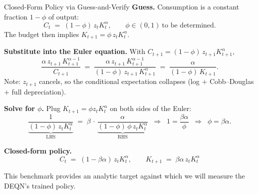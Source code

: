 \documentclass[aspectratio=169,11pt]{beamer}
\newcommand{\emphc}[1]{\textcolor{harvardcrimson}{#1}}
\begin{document}
\begin{frame}{Closed-Form Policy via Guess-and-Verify}
\footnotesize
\textbf{Guess.} Consumption is a constant fraction $1-\phi$ of output:
\[
C_t \;=\; (1-\phi)\, z_t K_t^{\alpha}, \qquad \phi \in (0,1)\ \text{to be determined.}
\]
The budget then implies $K_{t+1} = \phi\, z_t K_t^{\alpha}$.

\vspace{0.2em}
\textbf{Substitute into the Euler equation.} With $C_{t+1} = (1-\phi)\, z_{t+1} K_{t+1}^{\alpha}$,
\[
\frac{\alpha\, z_{t+1}\, K_{t+1}^{\alpha-1}}{C_{t+1}}
\;=\; \frac{\alpha\, z_{t+1}\, K_{t+1}^{\alpha-1}}{(1-\phi)\, z_{t+1}\, K_{t+1}^{\alpha}}
\;=\; \frac{\alpha}{(1-\phi)\, K_{t+1}}.
\]
\emphc{Note:} $z_{t+1}$ cancels, so the conditional expectation collapses (log $+$ Cobb--Douglas $+$ full depreciation).

\vspace{0.2em}
\textbf{Solve for $\phi$.} Plug $K_{t+1} = \phi z_t K_t^\alpha$ on both sides of the Euler:
\[
\underbrace{\frac{1}{(1-\phi)\, z_t K_t^{\alpha}}}_{\text{LHS}}
\;=\; \beta\, \cdot\, \underbrace{\frac{\alpha}{(1-\phi)\, \phi\, z_t K_t^{\alpha}}}_{\text{RHS}}
\;\;\Longrightarrow\;\; 1 = \frac{\beta\alpha}{\phi}
\;\;\Longrightarrow\;\; \phi = \beta\alpha.
\]

\vspace{0.2em}
\textbf{Closed-form policy.}
\[
\boxed{\;\; C_t \;=\; (1-\beta\alpha)\, z_t K_t^{\alpha},
\qquad K_{t+1} \;=\; \beta\alpha\, z_t K_t^{\alpha} \;\;}
\]

{\scriptsize This benchmark provides an analytic target against which we will measure the DEQN's trained policy.}
\end{frame}
\end{document}
